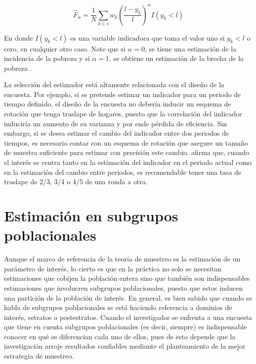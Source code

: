 \documentclass[
  10pt,
  spanish,
]{book}
\begin{document}
\[
\hat{F}_{\alpha}=\frac{1}{N}\sum_{k\in s} w_k 
\left(\frac{l-y_k}{l}\right)^{\alpha}I(y_k<l)
\]

En donde \(I(y_k<l)\) es una variable indicadora que toma el valor uno si \(y_k<l\) o cero, en cualquier otro caso. Note que si \(\alpha = 0\), se tiene una estimación de la incidencia de la pobreza y si \(\alpha = 1\), se obtiene un estimación de la brecha de la pobreza \citep{Foster_Greer_Thorbecke_1984}.

La selección del estimador está altamente relacionada con el diseño de la encuesta. Por ejemplo, si se pretende estimar un indicador para un periodo de tiempo definido, el diseño de la encuesta no debería inducir un esquema de rotación que tenga traslape de hogares, puesto que la correlación del indicador induciría un aumento de su varianza y por ende pérdida de eficiencia. Sin embargo, si se desea estimar el cambio del indicador entre dos periodos de tiempos, es necesario contar con un esquema de rotación que asegure un tamaño de muestra suficiente para estimar con precisión este cambio. \citet[sección 12.13]{Cochran_1977} afirma que, cuando el interés se centra tanto en la estimación del indicador en el periodo actual como en la estimación del cambio entre periodos, es recomendable tener una tasa de traslape de 2/3, 3/4 o 4/5 de una ronda a otra.

\hypertarget{estimaciuxf3n-en-subgrupos-poblacionales}{%
\section{Estimación en subgrupos poblacionales}\label{estimaciuxf3n-en-subgrupos-poblacionales}}

Aunque el marco de referencia de la teoría de muestreo es la estimación de un parámetro de interés, lo cierto es que en la práctica no solo se necesitan estimaciones que cobijen la población entera sino que también son indispensables estimaciones que involucren subgrupos poblacionales, puesto que estos inducen una partición de la población de interés. En general, es bien sabido que cuando se habla de subgrupos poblacionales se está haciendo referencia a dominios de interés, estratos o postestratos. Cuando el investigador se enfrenta a una encuesta que tiene en cuenta subgrupos poblacionales (es decir, siempre) es indispensable conocer en qué se diferencian cada uno de ellos, pues de esto depende que la investigación arroje resultados confiables mediante el planteamiento de la mejor estrategia de muestreo.
\end{document}
